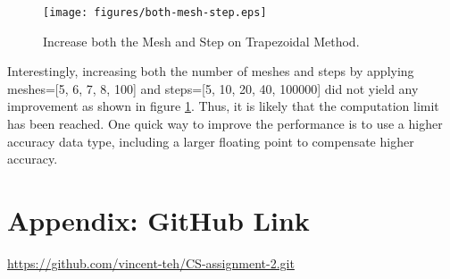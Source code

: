 \documentclass{article}
\begin{document}
\begin{figure}[H]
  \centering
  \texttt{[image: figures/both-mesh-step.eps]}
  \caption{Increase both the Mesh and Step on Trapezoidal Method.}
  \label{fig:figures-both-mesh-step-eps}
\end{figure}
Interestingly, increasing both the number of meshes and steps by applying meshes=[5, 6, 7, 8, 100] and steps=[5, 10, 20, 40, 100000] did not yield any improvement as shown in figure \ref{fig:figures-both-mesh-step-eps}. Thus, it is likely that the computation limit has been reached. One quick way to improve the performance is to use a higher accuracy data type, including a larger floating point to compensate higher accuracy.


\newpage
\section{Appendix: GitHub Link}%
\label{sec:Appendix: GitHub Link}
\url{https://github.com/vincent-teh/CS-assignment-2.git}
\end{document}
